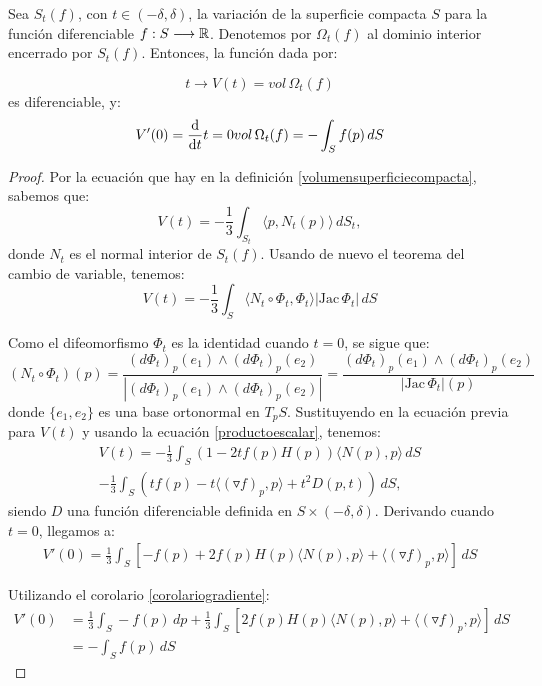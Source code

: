 \begin{proposition}
Sea $S_t(f)$, con $t \in (-\delta, \delta)$, la variación de la superficie compacta $S$ para la función diferenciable $f: S \longrightarrow \mathbb{R}$. Denotemos por $\Omega_t(f)$ al dominio interior encerrado por $S_t(f)$. Entonces, la función dada por:

\begin{equation*}
    t \longrightarrow V(t) = vol \, \Omega_t (f)
\end{equation*}
%
es diferenciable, y:
%
\begin{equation}\label{variacionvolumen}
    V'(0) = \diff{}{t}{t=0} vol \, \Omega_t (f) = - \int_S f(p) \, dS
\end{equation}
\end{proposition}
\begin{proof}
Por la ecuación que hay en la definición \ref{volumensuperficiecompacta}, sabemos que:
%
\begin{equation*}
    V(t) = - \frac{1}{3} \int_{S_t}  \langle p, N_t(p) \rangle \, dS_t,
\end{equation*}
%
donde $N_t$ es el normal interior de $S_t(f)$. Usando de nuevo el teorema del cambio de variable, tenemos:
%
\begin{equation*}
    V(t) = - \frac{1}{3} \int_{S}  \langle N_t \circ \Phi_t, \Phi_t \rangle |\text{Jac} \, \Phi_t| \, dS
\end{equation*}

Como el difeomorfismo $\Phi_t$ es la identidad cuando $t=0$, se sigue que:
%
\begin{equation*}
    (N_t \circ \Phi_t)(p) = \frac{(d\Phi_t)_p(e_1) \wedge (d\Phi_t)_p(e_2)}{|(d\Phi_t)_p(e_1) \wedge (d\Phi_t)_p(e_2)|} = \frac{(d\Phi_t)_p(e_1) \wedge (d\Phi_t)_p(e_2)}{|\text{Jac} \, \Phi_t|(p)}
\end{equation*}
%
donde $\{e_1,e_2\}$ es una base ortonormal en $T_pS$. Sustituyendo en la ecuación previa para $V(t)$ y usando la ecuación \ref{productoescalar}, tenemos:
%
\begin{align*}
    V(t) = - \frac{1}{3} \int_S \left( 1-2tf(p)H(p) \right) \langle N(p), p \rangle \, dS  \\ - \frac{1}{3} \int_S \left( tf(p) - t \langle (\triangledown f)_p, p \rangle  + t^2D(p,t) \right) \, dS,
\end{align*}
%
siendo $D$ una función diferenciable definida en $S \times (-\delta, \delta)$. Derivando cuando $t=0$, llegamos a:
%
\begin{align*}
    V'(0) = \frac{1}{3} \int_S [-f(p) + 2f(p)H(p) \langle N(p),p \rangle  +  \langle (\triangledown f)_p, p \rangle ] \, dS
\end{align*}

Utilizando el corolario \ref{corolariogradiente}:
%
\begin{align*}
    V'(0) &= \frac{1}{3} \int_S -f(p) \, dp + \frac{1}{3} \int_S [2f(p)H(p) \langle N(p),p \rangle  +  \langle (\triangledown f)_p, p \rangle ] \, dS \\ &= - \int_S f(p) \, dS
\end{align*}
\end{proof}


